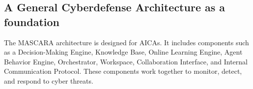 \subsection{A General Cyberdefense Architecture as a foundation}

The MASCARA architecture is designed for AICAs. It includes components such as a Decision-Making Engine, Knowledge Base, Online Learning Engine, Agent Behavior Engine, Orchestrator, Workspace, Collaboration Interface, and Internal Communication Protocol. These components work together to monitor, detect, and respond to cyber threats.
%


